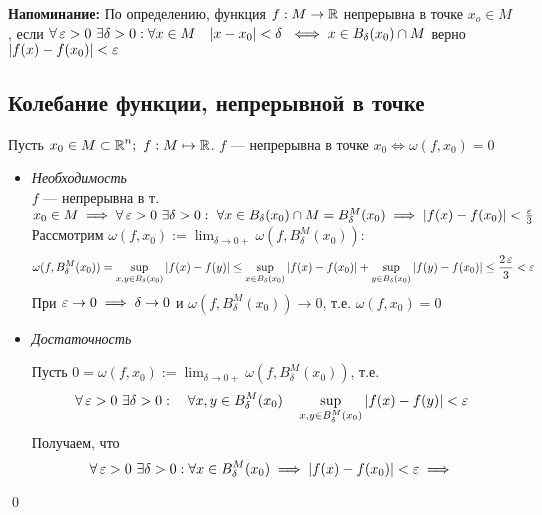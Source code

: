 \documentclass[a4paper, 10pt]{article}
\begin{document}
\textbf{Напоминание:} По определению, функция $f: M\to \operatorname{\mathbb{R}}$ непрерывна в точке $x_o\in M$, если $\forall \operatorname{\varepsilon} > 0\,\, \exists\delta > 0: \forall x\in M \quad |x-x_0| < \delta\,\, \iff x\in B_{\delta}(x_0) \cap M$ верно $|f(x) - f(x_0)| < \operatorname{\varepsilon}$

\subsection{Колебание функции, непрерывной в точке}
\theorem Пусть $x_0 \in M \subset \operatorname{\mathbb{R}}^n; \,\, f: M\mapsto\operatorname{\mathbb{R}}$. $f$ — непрерывна в точке $x_0 \iff \omega(f, x_0) = 0$

\proof
\begin{itemize}
    \item \textit{Необходимость}\\
        
        $f$ — непрерывна в т. $x_0 \in M \implies \forall \operatorname{\varepsilon} > 0 \,\, \exists\delta > 0:\,\, \forall x \in B_{\delta}(x_0)\cap M = B_{\delta}^M(x_0) \implies |f(x) - f(x_0)| < \frac{\operatorname{\varepsilon}}{3}$\\
        Рассмотрим $\omega(f, x_0) := \displaystyle\lim_{\delta\to0+} \omega(f, B_{\delta}^M(x_0))$:
        \begin{equation*}
            \begin{aligned}
                \omega(f, B_{\delta}^M(x_0)) = \sup_{x, y \in B_{\delta}(x_0)}|f(x) - f(y)| \le \sup_{x\in B_{\delta}(x_0)} |f(x) - f(x_0)| + \sup_{y\in B_{\delta}(x_0)} |f(y) - f(x_0)| \le \frac{2\operatorname{\varepsilon}}{3} < \operatorname{\varepsilon}
            \end{aligned}
        \end{equation*}
        При $\operatorname{\varepsilon}\to0 \implies \delta\to0$ и $\omega(f, B_{\delta}^M(x_0))\to0$, т.е. $\omega(f, x_0) = 0$

    \item \textit{Достаточность}

        Пусть $0 = \omega(f, x_0) := \displaystyle\lim_{\delta\to0+} \omega(f, B_{\delta}^M(x_0))$, т.е.
        \begin{equation*}
            \forall \operatorname{\varepsilon} > 0 \,\, \exists\delta > 0: \quad \forall x, y \in B_{\delta}^M(x_0) \quad \sup_{x, y\in B_{\delta}^M(x_0)} |f(x)-f(y)| < \operatorname{\varepsilon}
        \end{equation*}
        Получаем, что
        \begin{equation*}
            \forall \operatorname{\varepsilon} > 0 \,\, \exists \delta > 0: \forall x \in B_{\delta}^M(x_0) \implies |f(x)-f(x_0)| < \operatorname{\varepsilon} \implies
        \end{equation*}
\end{itemize}\qed
\end{document}

